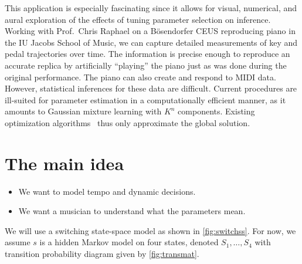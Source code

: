 \documentclass[11pt]{article}
\begin{document}
This application is especially fascinating since
it allows for visual, numerical, and aural exploration of the
effects of tuning parameter selection on inference. Working with
Prof.\ Chris Raphael on a
B\"{o}sendorfer CEUS reproducing piano in the IU Jacobs School
of Music, we can capture detailed 
measurements of key and pedal trajectories over time.  The
information is precise enough to reproduce an accurate replica by
artificially ``playing'' the piano just as was done during the
original performance. The piano can also create and respond to MIDI
data. However, statistical inferences for these data are difficult. Current
procedures are ill-suited for parameter estimation in a 
computationally efficient manner, as it amounts to Gaussian mixture
learning with $K^n$ components. Existing optimization
algorithms~\citep{Raphael2002,GhahramaniHinton2000} thus only
approximate the global solution. 


\section{The main idea}

\begin{itemize}
\item We want to model tempo and dynamic decisions.
\item We want a musician to understand what the parameters mean.
\end{itemize}


We will use a switching state-space model as shown in
\autoref{fig:switchss}. For now, we assume $s$ is a hidden Markov model on
four states, denoted $S_1,\ldots,S_4$ with transition probability
diagram given by \autoref{fig:transmat}.
\end{document}
